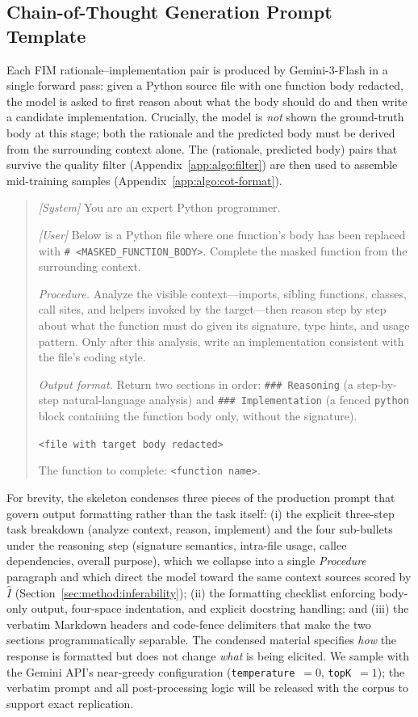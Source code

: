 \subsection{Chain-of-Thought Generation Prompt Template}
\label{app:algo:cot-gen}
Each FIM rationale--implementation pair is produced by Gemini-3-Flash
in a single forward pass: given a Python source file with one function
body redacted, the model is asked to first reason about what the body
should do and then write a candidate implementation. Crucially, the
model is \emph{not} shown the ground-truth body at this stage; both
the rationale and the predicted body must be derived from the
surrounding context alone. The (rationale, predicted body) pairs that
survive the quality filter (Appendix~\ref{app:algo:filter}) are then
used to assemble mid-training samples
(Appendix~\ref{app:algo:cot-format}).
\begin{quote}\small
\textit{[System]} You are an expert Python programmer.

\noindent\textit{[User]} Below is a Python file where one function's
body has been replaced with \texttt{\# <MASKED\_FUNCTION\_BODY>}.
Complete the masked function from the surrounding context.

\noindent\textit{Procedure.} Analyze the visible context---imports,
sibling functions, classes, call sites, and helpers invoked by the
target---then reason step by step about what the function must do
given its signature, type hints, and usage pattern. Only after this
analysis, write an implementation consistent with the file's coding
style.

\noindent\textit{Output format.} Return two sections in order:
\texttt{\#\#\# Reasoning} (a step-by-step natural-language analysis)
and \texttt{\#\#\# Implementation} (a fenced \texttt{python} block
containing the function body only, without the signature).

\noindent\texttt{<file with target body redacted>}

\noindent The function to complete: \texttt{<function name>}.
\end{quote}
For brevity, the skeleton condenses three pieces of the production
prompt that govern output formatting rather than the task itself:
(i) the explicit three-step task breakdown (analyze context, reason,
implement) and the four sub-bullets under the reasoning step
(signature semantics, intra-file usage, callee dependencies, overall
purpose), which we collapse into a single \textit{Procedure} paragraph
and which direct the model toward the same context sources scored by
$\hat{I}$ (Section~\ref{sec:method:inferability}); (ii) the
formatting checklist enforcing body-only output, four-space
indentation, and explicit docstring handling; and (iii) the verbatim
Markdown headers and code-fence delimiters that make the two sections
programmatically separable. The condensed material specifies
\emph{how} the response is formatted but does not change \emph{what}
is being elicited. We sample with the Gemini API's near-greedy
configuration (\texttt{temperature}~$=0$, \texttt{topK}~$=1$); the
verbatim prompt and all post-processing logic will be released with
the corpus to support exact replication.



